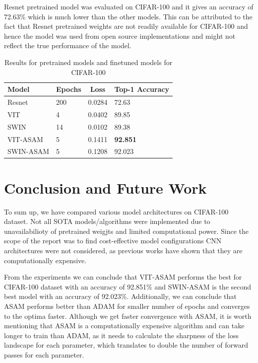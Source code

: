 \documentclass{article}
\begin{document}
Resnet pretrained model was evaluated on CIFAR-100 and it gives an accuracy of 72.63\% which is much lower than the other models.
This can be attributed to the fact that Resnet pretrained weights are not readily available for CIFAR-100 and hence the model was used from open source implementations and might not reflect the true performance of the model.

\begin{table}[ht]
    \begin{tabular}{|l|l|c|l|}
        \hline
        \textbf{Model} & \textbf{Epochs} & \textbf{Loss} & \textbf{Top-1 Accuracy} \\ \hline
        Resnet         & 200             & 0.0284        & 72.63                   \\ \hline
        VIT            & 4               & 0.0402        & 89.85                   \\ \hline
        SWIN           & 14              & 0.0102        & 89.38                   \\ \hline
        VIT-ASAM       & 5               & 0.1411        & \textbf{92.851}         \\ \hline
        SWIN-ASAM      & 5               & 0.1208        & 92.023                  \\ \hline
    \end{tabular}
    \caption{Results for pretrained models and finetuned models for CIFAR-100}
\end{table}


\section{Conclusion and Future Work}
To sum up, we have compared various model architectures on CIFAR-100 dataset.
Not all SOTA models/algorithms were implemented due to unavailabilioty of pretrained weigjts and limited computational power.
Since the scope of the report was to find cost-effective model configurations CNN architectures were not considered, as previous works have shown that they are computationally expensive.

From the experiments we can conclude that VIT-ASAM performs the best for CIFAR-100 dataset with an accuracy of 92.851\% and SWIN-ASAM is the second best model with an accuracy of 92.023\%.
Additionally, we can conclude that ASAM performs better than ADAM for smaller number of epochs and converges to the optima faster.
Although we get faster convergence with ASAM, it is worth mentioning that ASAM is a computationally expensive algorithm and can take longer to train than ADAM, as it needs to calculate the sharpness of the loss landscape for each parameter, which translates to double the number of forward passes for each parameter.
\end{document}
